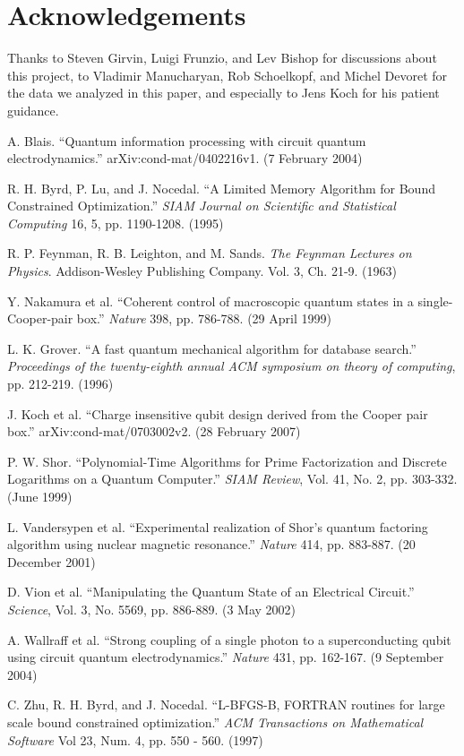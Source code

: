 \documentclass[twocolumn]{revtex4}
\begin{document}
\section{Acknowledgements}
Thanks to Steven Girvin, Luigi Frunzio, and Lev Bishop for discussions
about this project, to Vladimir Manucharyan, Rob Schoelkopf, and
Michel Devoret for the data we analyzed in this paper, and especially
to Jens Koch for his patient guidance.

\begin{thebibliography}{9}
 A. Blais. ``Quantum information processing with
  circuit quantum electrodynamics.'' arXiv:cond-mat/0402216v1. (7
  February 2004)

 R. H. Byrd, P. Lu, and J. Nocedal. ``A Limited Memory
  Algorithm for Bound Constrained Optimization.'' \textit{SIAM Journal
    on Scientific and Statistical Computing} 16, 5,
  pp. 1190-1208. (1995)
  
 R. P. Feynman, R. B. Leighton, and
  M. Sands. \textit{The Feynman Lectures on Physics}. Addison-Wesley
  Publishing Company. Vol. 3, Ch. 21-9. (1963)

 Y. Nakamura et al. ``Coherent control of
  macroscopic quantum states in a single-Cooper-pair box.''
  \textit{Nature} 398, pp. 786-788. (29 April 1999)

 L. K. Grover. ``A fast quantum mechanical algorithm
  for database search.'' \textit{Proceedings of the twenty-eighth
    annual ACM symposium on theory of computing}, pp. 212-219. (1996)

 J. Koch et al. ``Charge insensitive qubit design
  derived from the Cooper pair box.'' arXiv:cond-mat/0703002v2. (28
  February 2007)

 P. W. Shor. ``Polynomial-Time Algorithms for Prime
  Factorization and Discrete Logarithms on a Quantum Computer.''
  \textit{SIAM Review}, Vol. 41, No. 2, pp. 303-332. (June 1999)

 L. Vandersypen et al. ``Experimental realization
  of Shor's quantum factoring algorithm using nuclear magnetic
  resonance.'' \textit{Nature} 414, pp. 883-887. (20 December 2001)

 D. Vion et al. ``Manipulating the Quantum State of an
  Electrical Circuit.'' \textit{Science}, Vol. 3, No. 5569,
  pp. 886-889. (3 May 2002)
  
 A. Wallraff et al. ``Strong coupling of a single
  photon to a superconducting qubit using circuit quantum
  electrodynamics.'' \textit{Nature} 431, pp. 162-167. (9 September
  2004)

 C. Zhu, R. H. Byrd, and J. Nocedal. ``L-BFGS-B, FORTRAN
  routines for large scale bound constrained optimization.''
  \textit{ACM Transactions on Mathematical Software} Vol 23, Num. 4,
  pp. 550 - 560. (1997)

\end{thebibliography}
\end{document}
